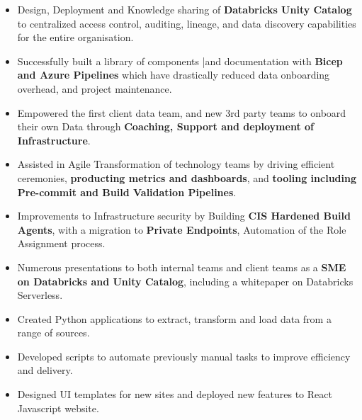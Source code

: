 \documentclass[10pt,a4paper,ragged2e]{maltacv}
\begin{document}


\makecvheader


\bigskip

\begin{itemize}
  \item Design, Deployment and Knowledge sharing of \textbf{Databricks Unity Catalog} to centralized access control, auditing, lineage, and data discovery capabilities for the entire organisation.
  \item Successfully built a library of components |and documentation with \textbf{Bicep and Azure Pipelines} which have drastically reduced data onboarding overhead, and project maintenance.
  \item Empowered the first client data team, and new 3rd party teams to onboard their own Data through \textbf{Coaching, Support and deployment of Infrastructure}.
  \item Assisted in Agile Transformation of technology teams by driving efficient ceremonies, \textbf{producting metrics and dashboards}, and \textbf{tooling including Pre-commit and Build Validation Pipelines}.
  \item Improvements to Infrastructure security by Building \textbf{CIS Hardened Build Agents}, with a migration to \textbf{Private Endpoints}, Automation of the Role Assignment process.
  \item Numerous presentations to both internal teams and client teams as a \textbf{SME on Databricks and Unity Catalog}, including a whitepaper on Databricks Serverless.
\end{itemize}

\bigskip

\begin{itemize}
  \item Created Python applications to extract, transform and load data from a range of sources.
  \item Developed scripts to automate previously manual tasks to improve efficiency and delivery.
  \item Designed UI templates for new sites and deployed new features to React Javascript website.
\end{itemize}
\end{document}
